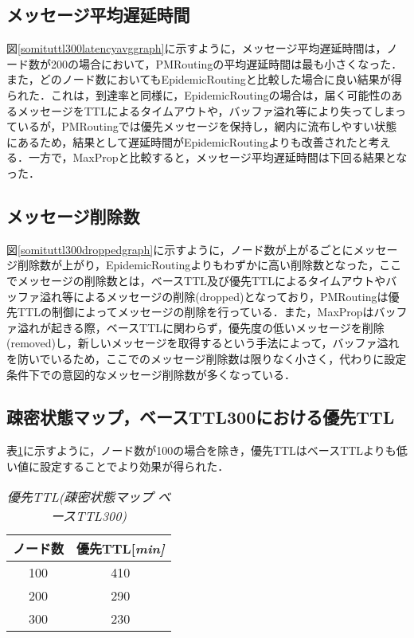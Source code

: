 \documentclass[11pt]{icsthesis}
\begin{document}
\subsection{メッセージ平均遅延時間}
図\ref{somituttl300latencyavggraph}に示すように，メッセージ平均遅延時間は，ノード数が200の場合において，PMRoutingの平均遅延時間は最も小さくなった．また，どのノード数においてもEpidemicRoutingと比較した場合に良い結果が得られた．これは，到達率と同様に，EpidemicRoutingの場合は，届く可能性のあるメッセージをTTLによるタイムアウトや，バッファ溢れ等により失ってしまっているが，PMRoutingでは優先メッセージを保持し，網内に流布しやすい状態にあるため，結果として遅延時間がEpidemicRoutingよりも改善されたと考える．一方で，MaxPropと比較すると，メッセージ平均遅延時間は下回る結果となった．\\

\subsection{メッセージ削除数}
図\ref{somituttl300droppedgraph}に示すように，ノード数が上がるごとにメッセージ削除数が上がり，EpidemicRoutingよりもわずかに高い削除数となった，ここでメッセージの削除数とは，ベースTTL及び優先TTLによるタイムアウトやバッファ溢れ等によるメッセージの削除(dropped)となっており，PMRoutingは優先TTLの制御によってメッセージの削除を行っている．また，MaxPropはバッファ溢れが起きる際，ベースTTLに関わらず，優先度の低いメッセージを削除(removed)し，新しいメッセージを取得するという手法によって，バッファ溢れを防いでいるため，ここでのメッセージ削除数は限りなく小さく，代わりに設定条件下での意図的なメッセージ削除数が多くなっている．\\
\subsection{疎密状態マップ，ベースTTL300における優先TTL}
表\ref{priorityTTL_somitsu300}に示すように，ノード数が100の場合を除き，優先TTLはベースTTLよりも低い値に設定することでより効果が得られた．
\begin{table}[H]
	\begin{center}
			 \caption[]{\it{優先TTL(疎密状態マップ ベースTTL300)}}
			 \label{priorityTTL_somitsu300}
			 \begin{tabular}{|c|c|}
 \hline
 ノード数&優先TTL[\it{min}]\\
 \hline
 100&410\\
 \hline
 200&290\\
 \hline
 300&230\\
 \hline
			 \end{tabular}
		 \end{center}
 \end{table}
\newpage
\end{document}
